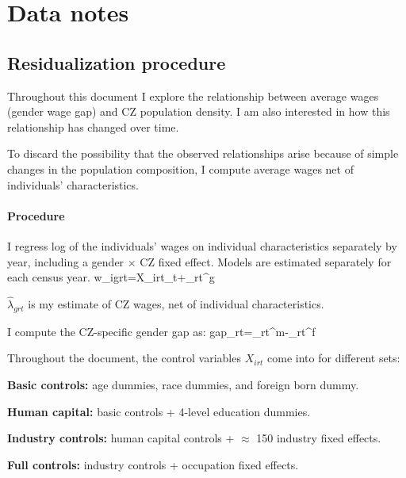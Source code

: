 \section{Data notes}
\subsection{Residualization procedure}
Throughout this document I explore the relationship between average wages (gender wage gap) and CZ population density. I am also interested in how this relationship has changed over time.

To discard the possibility that the observed relationships arise because of simple changes in the population composition, I compute average wages net of individuals' characteristics.

\paragraph{Procedure}
\benu
	\item I regress log of the individuals' wages on individual characteristics separately by year, including a gender $\times$ CZ fixed effect. Models are estimated separately for each census year.
	\beqns
		w_{igrt}=X_{irt}\gamma_t+\lambda_{rt}^g
	\eeqns
	\item $\hat{\lambda}_{grt}$ is my estimate of CZ wages, net of individual characteristics.
	\item I compute the CZ-specific gender gap as:
	\beqns
		gap_{rt}=\hat{\lambda}_{rt}^m-\hat{\lambda}_{rt}^f
	\eeqns
\eenu

Throughout the document, the control variables $X_{irt}$ come into for different sets:
\bitem
	\item \textbf{Basic controls:} age dummies, race dummies, and foreign born dummy.
	\item \textbf{Human capital:} basic controls + 4-level education dummies.
	\item \textbf{Industry controls:} human capital controls + $\approx$ 150 industry fixed effects.
	\item \textbf{Full controls:} industry controls + occupation fixed effects.
\eitem